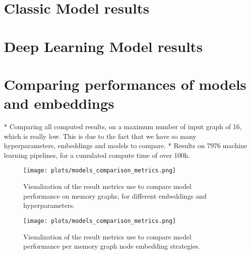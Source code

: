 \section{Classic Model results}

\section{Deep Learning Model results}


\section{Comparing performances of models and embeddings}
* Comparing all computed results, on a maximum number of input graph of 16, which is really low. This is due to the fact that we have so many hyperparameters, embeddings and models to compare.
* Results on 7976 machine learning pipelines, for a cumulated compute time of over 100h.

\begin{figure}[H]\label{results:compare:models:full}
    \centering
    \texttt{[image: plots/models\_comparison\_metrics.png]}
    \caption{Visualization of the result metrics use to compare model performance on memory graphs, for different embeddings and hyperparameters.}
\end{figure}

\begin{figure}[H]\label{results:compare:embeddings:full}
    \centering
    \texttt{[image: plots/models\_comparison\_metrics.png]}
    \caption{Visualization of the result metrics use to compare model performance per memory graph node embedding strategies.}
\end{figure}


